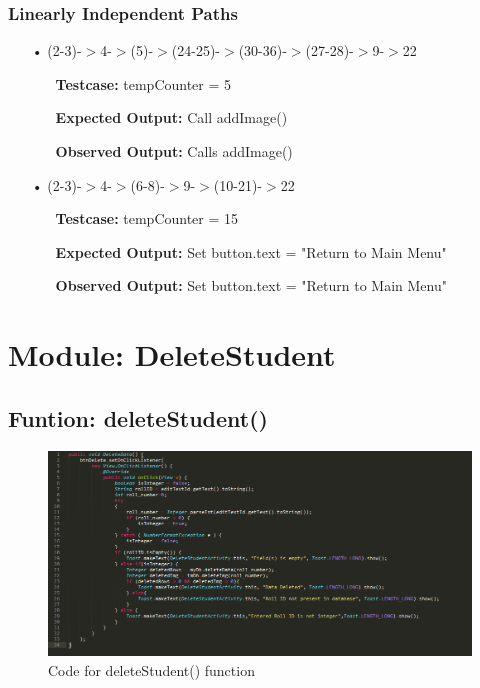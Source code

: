 \documentclass{scrreprt}
\begin{document}
\subsubsection{Linearly Independent Paths}
\begin{enumerate}
\item[•](2-3)-$>$4-$>$(5)-$>$(24-25)-$>$(30-36)-$>$(27-28)-$>$9-$>$22
\begin{itemize}
\item[]\textbf{Testcase: }tempCounter = 5
\item[]\textbf{Expected Output: }Call addImage()
\item[]\textbf{Observed Output: }Calls addImage()
\end{itemize}

\item[•](2-3)-$>$4-$>$(6-8)-$>$9-$>$(10-21)-$>$22
\begin{itemize}
\item[]\textbf{Testcase: }tempCounter = 15
\item[]\textbf{Expected Output: }Set button.text = "Return to Main Menu"
\item[]\textbf{Observed Output: }Set button.text = "Return to Main Menu"
\end{itemize}

\end{enumerate}	

\section{Module: DeleteStudent}
\subsection{Funtion: deleteStudent()}
\begin{figure}[H]
\centering
\includegraphics[width=\textwidth, keepaspectratio]{deleteStudentcode.png}
\caption{Code for deleteStudent() function}
\end{figure}
\end{document}
